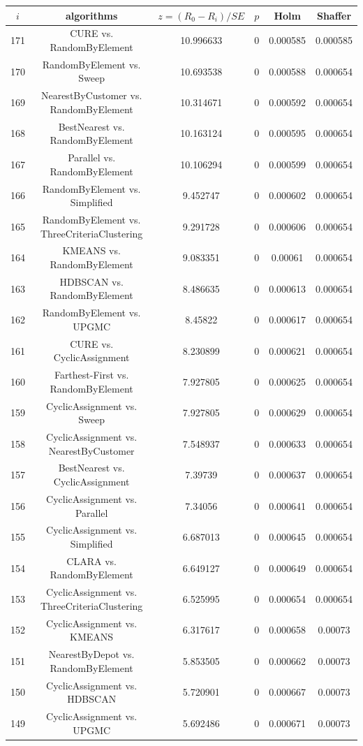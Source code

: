 \documentclass[a4paper,10pt]{article}
\begin{document}
\begin{landscape}
\begin{table}[!htp]
\centering\scriptsize
\begin{tabular}{cccccc}
$i$&algorithms&$z=(R_0 - R_i)/SE$&$p$&Holm&Shaffer\\
\hline171&CURE vs. RandomByElement&10.996633&0&0.000585&0.000585\\
170&RandomByElement vs. Sweep&10.693538&0&0.000588&0.000654\\
169&NearestByCustomer vs. RandomByElement&10.314671&0&0.000592&0.000654\\
168&BestNearest vs. RandomByElement&10.163124&0&0.000595&0.000654\\
167&Parallel vs. RandomByElement&10.106294&0&0.000599&0.000654\\
166&RandomByElement vs. Simplified&9.452747&0&0.000602&0.000654\\
165&RandomByElement vs. ThreeCriteriaClustering&9.291728&0&0.000606&0.000654\\
164&KMEANS vs. RandomByElement&9.083351&0&0.00061&0.000654\\
163&HDBSCAN vs. RandomByElement&8.486635&0&0.000613&0.000654\\
162&RandomByElement vs. UPGMC&8.45822&0&0.000617&0.000654\\
161&CURE vs. CyclicAssignment&8.230899&0&0.000621&0.000654\\
160&Farthest-First vs. RandomByElement&7.927805&0&0.000625&0.000654\\
159&CyclicAssignment vs. Sweep&7.927805&0&0.000629&0.000654\\
158&CyclicAssignment vs. NearestByCustomer&7.548937&0&0.000633&0.000654\\
157&BestNearest vs. CyclicAssignment&7.39739&0&0.000637&0.000654\\
156&CyclicAssignment vs. Parallel&7.34056&0&0.000641&0.000654\\
155&CyclicAssignment vs. Simplified&6.687013&0&0.000645&0.000654\\
154&CLARA vs. RandomByElement&6.649127&0&0.000649&0.000654\\
153&CyclicAssignment vs. ThreeCriteriaClustering&6.525995&0&0.000654&0.000654\\
152&CyclicAssignment vs. KMEANS&6.317617&0&0.000658&0.00073\\
151&NearestByDepot vs. RandomByElement&5.853505&0&0.000662&0.00073\\
150&CyclicAssignment vs. HDBSCAN&5.720901&0&0.000667&0.00073\\
149&CyclicAssignment vs. UPGMC&5.692486&0&0.000671&0.00073\\

\end{tabular}
\end{table}
\end{landscape}
\end{document}

